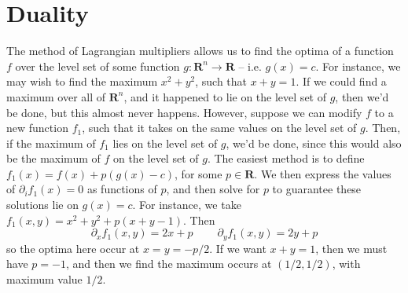 \begin{comment}
    \begin{theorem}
        The following are equivalent:

        \begin{enumerate}
            \item The polyhedron does not contain a line
            \item The polyhedron has at least one extreme point.
            \item There are $n$ rows in the matrix defining the polyhedron that are linearly independant.
        \end{enumerate}
    \end{theorem}

    \begin{proof}
        We prove the implications in the order they appear:

        \begin{itemize}
            \item $(1) \implies (2)$: We prove that if a polyhedron does not contain a line, it has a basic feasible solution, and therefore must have an extreme point. Let $x$ be a point in the polyhedron...
        \end{itemize}
    \end{proof}

\end{comment}









\chapter{Duality}

The method of Lagrangian multipliers allows us to find the optima of a function $f$ over the level set of some function $g: \mathbf{R}^n \to \mathbf{R}$ -- i.e. $g(x) = c$. For instance, we may wish to find the maximum $x^2 + y^2$, such that $x + y = 1$. If we could find a maximum over all of $\mathbf{R}^n$, and it happened to lie on the level set of $g$, then we'd be done, but this almost never happens. However, suppose we can modify $f$ to a new function $f_1$, such that it takes on the same values on the level set of $g$. Then, if the maximum of $f_1$ lies on the level set of $g$, we'd be done, since this would also be the maximum of $f$ on the level set of $g$. The easiest method is to define $f_1(x) = f(x) + p(g(x) - c)$, for some $p \in \mathbf{R}$. We then express the values of $\partial_i f_1(x) = 0$ as functions of $p$, and then solve for $p$ to guarantee these solutions lie on $g(x) = c$. For instance, we take $f_1(x,y) = x^2 + y^2 + p(x + y - 1)$. Then
%
\[ \partial_x f_1(x,y) = 2x + p\ \ \ \ \ \ \ \ \ \ \partial_y f_1(x,y) = 2y + p \]
%
so the optima here occur at $x = y = -p/2$. If we want $x + y = 1$, then we must have $p = -1$, and then we find the maximum occurs at $(1/2,1/2)$, with maximum value $1/2$.

